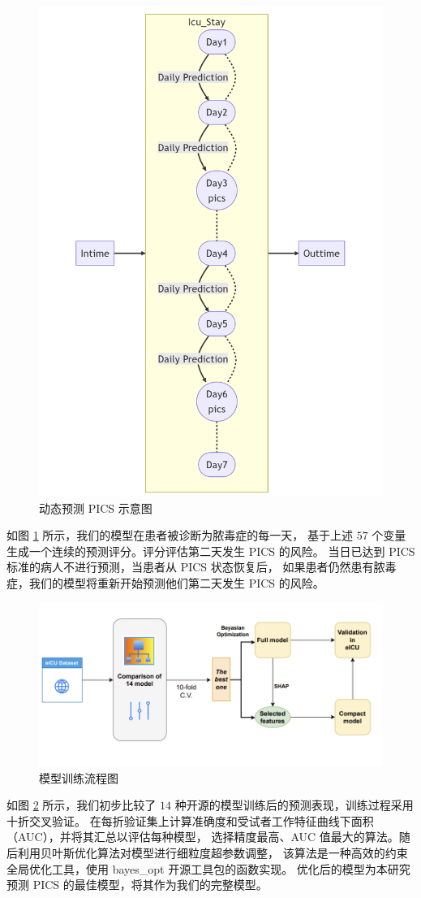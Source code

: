 \documentclass[12pt,titlepage]{article}
\begin{document}
\begin{figure}[htb]
    \centering
    \includegraphics[width=0.6\linewidth]{../img/predicting.png}
    \caption{动态预测 PICS 示意图}
    \label{fig:predicting}
\end{figure}

如图 \ref{fig:predicting} 所示，我们的模型在患者被诊断为脓毒症的每一天，%
基于上述 $57$ 个变量生成一个连续的预测评分。评分评估第二天发生 PICS 的风险。%
当日已达到 PICS 标准的病人不进行预测，当患者从 PICS 状态恢复后，%
如果患者仍然患有脓毒症，我们的模型将重新开始预测他们第二天发生 PICS 的风险。%

\begin{figure}[htb]
    \centering
    \includegraphics[width=0.9\linewidth]{../img/training.png}
    \caption{模型训练流程图}
    \label{fig:training}
\end{figure}

如图 \ref{fig:training} 所示，我们初步比较了 $14$ 种开源的模型训练后的预测表现，训练过程采用十折交叉验证。%
在每折验证集上计算准确度和受试者工作特征曲线下面积（AUC），并将其汇总以评估每种模型，%
选择精度最高、AUC 值最大的算法。随后利用贝叶斯优化算法对模型进行细粒度超参数调整，%
该算法是一种高效的约束全局优化工具，使用 bayes\_opt 开源工具包的函数实现。%
优化后的模型为本研究预测 PICS 的最佳模型，将其作为我们的完整模型。
\end{document}

